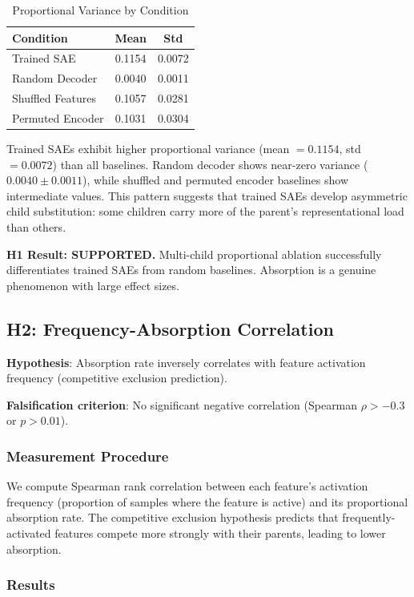 \documentclass{article}
\begin{document}
\begin{table}[t]
\caption{Proportional Variance by Condition}
\label{tab:prop_variance}
\centering
\begin{tabular}{lcc}
\toprule
Condition & Mean & Std \\
\midrule
Trained SAE & 0.1154 & 0.0072 \\
Random Decoder & 0.0040 & 0.0011 \\
Shuffled Features & 0.1057 & 0.0281 \\
Permuted Encoder & 0.1031 & 0.0304 \\
\bottomrule
\end{tabular}
\end{table}

Trained SAEs exhibit higher proportional variance (mean $= 0.1154$, std $= 0.0072$) than all baselines. Random decoder shows near-zero variance ($0.0040 \pm 0.0011$), while shuffled and permuted encoder baselines show intermediate values. This pattern suggests that trained SAEs develop asymmetric child substitution: some children carry more of the parent's representational load than others.

\textbf{H1 Result: SUPPORTED.} Multi-child proportional ablation successfully differentiates trained SAEs from random baselines. Absorption is a genuine phenomenon with large effect sizes.

\subsection{H2: Frequency-Absorption Correlation}

\textbf{Hypothesis}: Absorption rate inversely correlates with feature activation frequency (competitive exclusion prediction).

\textbf{Falsification criterion}: No significant negative correlation (Spearman $\rho > -0.3$ or $p > 0.01$).

\subsubsection{Measurement Procedure}

We compute Spearman rank correlation between each feature's activation frequency (proportion of samples where the feature is active) and its proportional absorption rate. The competitive exclusion hypothesis predicts that frequently-activated features compete more strongly with their parents, leading to lower absorption.

\subsubsection{Results}
\end{document}
